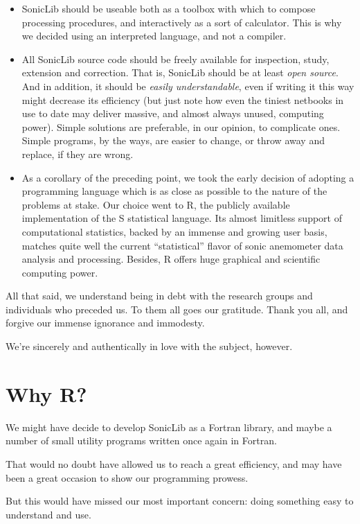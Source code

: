 \documentclass[a4paper,10pt]{book}
\begin{document}
\begin{itemize}
 \item SonicLib should be useable both as a toolbox with which to compose processing procedures, and interactively as a sort of calculator. This is why we decided using an interpreted language, and not a compiler.
 \item All SonicLib source code should be freely available for inspection, study, extension and correction. That is, SonicLib should be at least \emph{open source}. And in addition, it should be \emph{easily understandable}, even if writing it this way might decrease its efficiency (but just note how even the tiniest netbooks in use to date may deliver massive, and almost always unused, computing power). Simple solutions are preferable, in our opinion, to complicate ones. Simple programs, by the ways, are easier to change, or throw away and replace, if they are wrong.
 \item As a corollary of the preceding point, we took the early decision of adopting a programming language which is as close as possible to the nature of the problems at stake. Our choice went to R, the publicly available implementation of the S statistical language. Its almost limitless support of computational statistics, backed by an immense and growing user basis, matches quite well the current ``statistical'' flavor of sonic anemometer data analysis and processing. Besides, R offers huge graphical and scientific computing power.
\end{itemize}

All that said, we understand being in debt with the research groups and individuals who preceded us. To them all goes our gratitude. Thank you all, and forgive our immense ignorance and immodesty.

We're sincerely and authentically in love with the subject, however.

\section{Why R?}

We might have decide to develop SonicLib as a Fortran library, and maybe a number of small utility programs written once again in Fortran.

That would no doubt have allowed us to reach a great efficiency, and may have been a great occasion to show our programming prowess.

But this would have missed our most important concern: doing something easy to understand and use.
\end{document}
